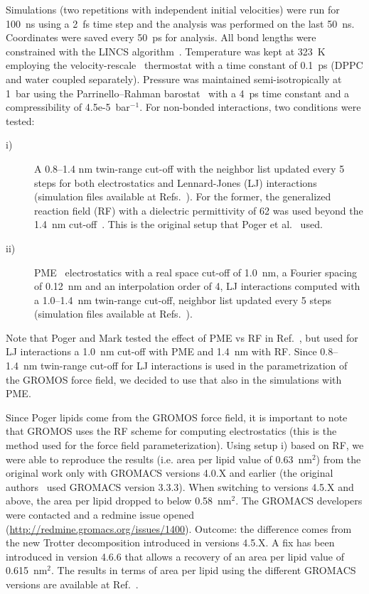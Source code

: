 \documentclass[journal=jacsat,manuscript=article]{achemso}
\begin{document}
Simulations (two repetitions with independent initial velocities) were run for 100~ns using a 2~fs time step and the analysis 
was performed on the last 50~ns. Coordinates were saved every 50~ps for analysis. All bond lengths were constrained with the LINCS algorithm~\cite{hess97,hess07}. Temperature was kept 
at 323~K employing the velocity-rescale~\cite{bussi07} thermostat with a time constant of 0.1~ps (DPPC and water coupled separately). Pressure was maintained semi-isotropically at 1~bar using 
the Parrinello--Rahman barostat~\cite{parrinello81} with a 4~ps time constant and a compressibility of 4.5e-5~bar$^{-1}$. For non-bonded interactions, two conditions were tested:
\begin{description}
\item[i)]
{\noindent A 0.8--1.4 nm twin-range cut-off with the neighbor list updated every 5 steps for both electrostatics and Lennard-Jones (LJ) interactions 
(simulation files available at Refs.~). For the former, the generalized reaction 
field (RF) with a dielectric permittivity of 62 was used beyond the 1.4~nm cut-off~\cite{tironi95}. This is the original setup that Poger et al.~\cite{poger10} used.
}
\item[ii)]
{\noindent PME~\cite{darden93,essman95} electrostatics with a real space cut-off of 1.0~nm, a Fourier spacing of 0.12~nm and an interpolation order of 4, LJ interactions computed with a 1.0--1.4~nm twin-range cut-off,
neighbor list updated every 5 steps (simulation files available at Refs.~).
}
\end{description}
Note that Poger and Mark tested the effect of PME vs RF in Ref.~, but used for LJ interactions a 1.0~nm cut-off with PME and 1.4~nm with RF. Since 0.8--1.4~nm twin-range cut-off for LJ interactions is used in the parametrization of the GROMOS force field, we decided to use that also in the simulations with PME.

Since Poger lipids come from the GROMOS force field, it is important to note that GROMOS uses the RF scheme for computing electrostatics (this is the method used for the 
force field parameterization). Using setup i) based on RF, we were able to reproduce the results (i.e. area per lipid value of 0.63~nm$^2$) from the original work only with 
GROMACS versions 4.0.X and earlier (the original authors~\cite{poger10} used GROMACS version 3.3.3). When switching to versions 4.5.X and above, the area per lipid dropped to below 0.58~nm$^2$. 
The GROMACS developers were contacted and a redmine issue opened (\url{http://redmine.gromacs.org/issues/1400}). Outcome: the difference comes from the new Trotter decomposition 
introduced in versions 4.5.X. A fix has been introduced in version 4.6.6 that allows a recovery of an area per lipid value of 0.615~nm$^2$. The results in terms of area per lipid using the different 
GROMACS versions are available at Ref.~.
\end{document}
